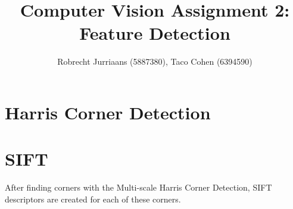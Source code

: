 \documentclass[a4paper,10pt]{article}
\title{Computer Vision Assignment 2: Feature Detection}
\author{Robrecht Jurriaans (5887380), Taco Cohen (6394590)}
\begin{document}
\maketitle


\section{Harris Corner Detection}


\section{SIFT}
After finding corners with the Multi-scale Harris Corner Detection, SIFT descriptors are created for each of these corners. 
\end{document}
